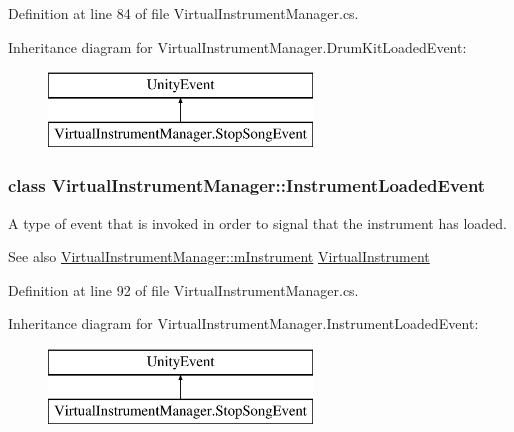 Definition at line 84 of file Virtual\+Instrument\+Manager.\+cs.

Inheritance diagram for Virtual\+Instrument\+Manager.\+Drum\+Kit\+Loaded\+Event\+:\begin{figure}[H]
\begin{center}
\leavevmode
\includegraphics[height=2.000000cm]{group___v_i_m_event_types}
\end{center}
\end{figure}
\label{class_virtual_instrument_manager_1_1_instrument_loaded_event}
\subsubsection{class Virtual\+Instrument\+Manager\+:\+:Instrument\+Loaded\+Event}
A type of event that is invoked in order to signal that the instrument has loaded. 

\begin{DoxySeeAlso}{See also}
\hyperlink{group___v_i_m_priv_gaed435d1f9be09864846db4322dc21fd1}{Virtual\+Instrument\+Manager\+::m\+Instrument} \hyperlink{class_virtual_instrument}{Virtual\+Instrument} 
\end{DoxySeeAlso}


Definition at line 92 of file Virtual\+Instrument\+Manager.\+cs.

Inheritance diagram for Virtual\+Instrument\+Manager.\+Instrument\+Loaded\+Event\+:\begin{figure}[H]
\begin{center}
\leavevmode
\includegraphics[height=2.000000cm]{group___v_i_m_event_types}
\end{center}
\end{figure}
\label{class_virtual_instrument_manager_1_1_modify_echo_filter_event}
